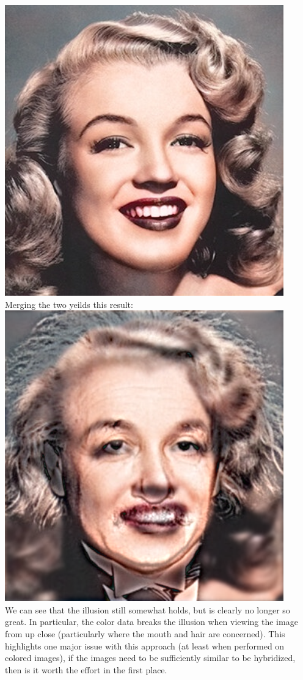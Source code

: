 \documentclass[notitlepage]{article}
\begin{document}
\includegraphics[width=4.75in]{../assets/images/rgb_monroe.png}
\\
Merging the two yeilds this result:
\\
\includegraphics[width=4.75in]{../samples/images/rgb_einstein_monroe.png}
\\
We can see that the illusion still somewhat holds, but is clearly no longer so great. In particular,
the color data breaks the illusion when viewing the image from up close (particularly where the mouth
and hair are concerned). This highlights one major issue with this approach (at least when performed on colored images),
if the images need to be sufficiently similar to be hybridized, then is it worth the effort in the first place.
\end{document}
